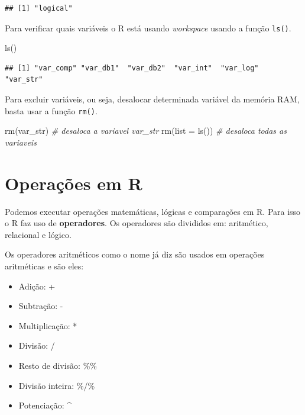 \documentclass[
]{book}
\newenvironment{Shaded}{\begin{snugshade}}{\end{snugshade}}
\newcommand{\AttributeTok}[1]{\textcolor[rgb]{0.77,0.63,0.00}{#1}}
\newcommand{\CommentTok}[1]{\textcolor[rgb]{0.56,0.35,0.01}{\textit{#1}}}
\newcommand{\FunctionTok}[1]{\textcolor[rgb]{0.00,0.00,0.00}{#1}}
\newcommand{\NormalTok}[1]{#1}
\providecommand{\tightlist}{%
  \setlength{\itemsep}{0pt}\setlength{\parskip}{0pt}}
\begin{document}
\begin{verbatim}
## [1] "logical"
\end{verbatim}

Para verificar quais variáveis o R está usando \emph{workspace} usando a função \texttt{ls()}.

\begin{Shaded}
\begin{Highlighting}[]
\FunctionTok{ls}\NormalTok{()}
\end{Highlighting}
\end{Shaded}

\begin{verbatim}
## [1] "var_comp" "var_db1"  "var_db2"  "var_int"  "var_log"  "var_str"
\end{verbatim}

Para excluir variáveis, ou seja, desalocar determinada variável da memória RAM, basta usar a função \texttt{rm()}.

\begin{Shaded}
\begin{Highlighting}[]
\FunctionTok{rm}\NormalTok{(var\_str)     }\CommentTok{\# desaloca a variavel var\_str}
\FunctionTok{rm}\NormalTok{(}\AttributeTok{list =} \FunctionTok{ls}\NormalTok{()) }\CommentTok{\# desaloca todas as variaveis}
\end{Highlighting}
\end{Shaded}

\hypertarget{operauxe7uxf5es-em-r}{%
\section{Operações em R}\label{operauxe7uxf5es-em-r}}

Podemos executar operações matemáticas, lógicas e comparações em R. Para isso o R faz uso de \textbf{operadores}. Os operadores são divididos em: aritmético, relacional e lógico.

Os operadores aritméticos como o nome já diz são usados em operações aritméticas e são eles:

\begin{itemize}
\tightlist
\item
  Adição: +
\item
  Subtração: -
\item
  Multiplicação: *
\item
  Divisão: /
\item
  Resto de divisão: \%\%
\item
  Divisão inteira: \%/\%
\item
  Potenciação: \^{}
\end{itemize}
\end{document}
